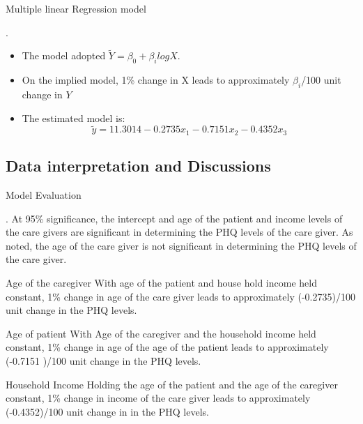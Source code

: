 \documentclass{beamer}
\numberwithin{equation}{section}
\numberwithin{table}{section}
\begin{document}
\begin{frame}{Multiple linear Regression model}
	
\begin{block}{.}
	\begin{itemize}
\item  The model adopted  $\tilde{Y}=\beta_{0}+\beta_{i}log X$.
\vspace{2mm}
\item On the implied model, 1\% change in X leads to approximately $\beta_{i}$/100 unit change in $Y$
\vspace{2mm}
\item  The estimated model is:
$$\tilde{y}=11.3014-0.2735x_{1}-0.7151x_{2}-0.4352x_{3}$$
	\end{itemize}
\end{block}

\end{frame}

\subsection{Data interpretation and Discussions}
\begin{frame}{Model Evaluation}
	\begin{block}{.}
 At 95\% significance, the intercept and age of the patient and income levels of the care givers are significant in determining the PHQ levels of the care giver. As noted, the age of the care giver is not significant in determining the PHQ levels of the care giver.\\
	\end{block}
\end{frame}

\begin{frame}
\begin{block}{Age of the caregiver}
With age of the patient and house hold income held constant, 1\% change in age of the care giver leads to approximately (-0.2735)/100 unit change in the PHQ levels.
\end{block}


\vspace{0.2cm}
\begin{block}{Age of patient}
With Age of the caregiver and the household income held constant, 1\% change in age of the age of the patient leads to approximately (-0.7151 )/100 unit change in the PHQ levels.
\end{block}
\vspace{0.2cm}
\begin{block}{Household Income}
Holding the age of the patient and the age of the caregiver constant, 1\% change in income  of the care giver leads to approximately (-0.4352)/100 unit change in in the PHQ levels.
\end{block}

\end{frame}
\end{document}
